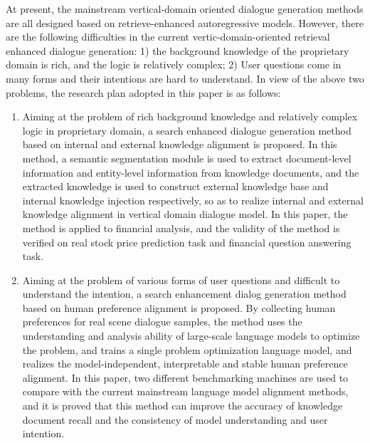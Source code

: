 At present, the mainstream vertical-domain oriented dialogue generation methods are all designed based on retrieve-enhanced autoregressive models. However, there are the following difficulties in the current vertic-domain-oriented retrieval enhanced dialogue generation: 1) the background knowledge of the proprietary domain is rich, and the logic is relatively complex; 2) User questions come in many forms and their intentions are hard to understand. In view of the above two problems, the research plan adopted in this paper is as follows:

\begin{enumerate}[topsep = 0 pt, itemsep= 0 pt, parsep=0pt, partopsep=0pt, leftmargin=0pt, itemindent=44pt, labelsep=6pt, listparindent=24pt, label=\arabic*)]
	\item Aiming at the problem of rich background knowledge and relatively complex logic in proprietary domain, a search enhanced dialogue generation method based on internal and external knowledge alignment is proposed. In this method, a semantic segmentation module is used to extract document-level information and entity-level information from knowledge documents, and the extracted knowledge is used to construct external knowledge base and internal knowledge injection respectively, so as to realize internal and external knowledge alignment in vertical domain dialogue model. In this paper, the method is applied to financial analysis, and the validity of the method is verified on real stock price prediction task and financial question answering task.

	\item Aiming at the problem of various forms of user questions and difficult to understand the intention, a search enhancement dialog generation method based on human preference alignment is proposed. By collecting human preferences for real scene dialogue samples, the method uses the understanding and analysis ability of large-scale language models to optimize the problem, and trains a single problem optimization language model, and realizes the model-independent, interpretable and stable human preference alignment. In this paper, two different benchmarking machines are used to compare with the current mainstream language model alignment methods, and it is proved that this method can improve the accuracy of knowledge document recall and the consistency of model understanding and user intention.
\end{enumerate}

